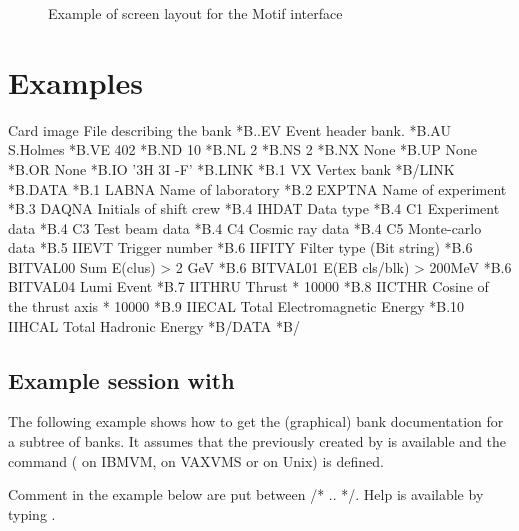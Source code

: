 \begin{figure}[p]
  \begin{center}
     \mbox{}
    \caption{Example of screen layout for the Motif interface}
    \label{fig:DZDOCFIG6}
  \end{center}
\end{figure}

\clearpage
 
\section{Examples}
\label{sec:dzdocexamples} 
 
\begin{XMPt}{Card image File describing the bank }
*B..EV  Event header bank.
*B.AU    S.Holmes
*B.VE    402
*B.ND    10
*B.NL    2
*B.NS    2
*B.NX    None
*B.UP    None
*B.OR    None
*B.IO    '3H 3I -F'
*B.LINK
*B.1   VX       Vertex bank
*B/LINK
*B.DATA
*B.1   LABNA     Name of laboratory
*B.2   EXPTNA    Name of experiment
*B.3   DAQNA     Initials of shift crew 
*B.4   IHDAT     Data type
*B.4   C1        Experiment data
*B.4   C3        Test beam data
*B.4   C4        Cosmic ray data
*B.4   C5        Monte-carlo data
*B.5   IIEVT     Trigger number
*B.6   IIFITY    Filter type (Bit string)
*B.6   BITVAL00  Sum E(clus) > 2 GeV
*B.6   BITVAL01  E(EB cls/blk) > 200MeV
*B.6   BITVAL04  Lumi Event
*B.7   IITHRU    Thrust * 10000
*B.8   IICTHR    Cosine of the thrust axis * 10000
*B.9   IIECAL    Total Electromagnetic Energy
*B.10  IIHCAL    Total Hadronic Energy
*B/DATA
*B/
\end{XMPt}
 
\newpage

\subsection[Example session with {\tt DZEDIT}]{Example session with }
 
The following example shows how to get the (graphical) bank
documentation for a subtree of banks. 
It assumes that the \RZfile{} previously created by  
is available and the command 
 ( on IBMVM, 
 on VAXVMS or  on Unix) is defined. 
 
Comment in the example below are put between /* .. */.
Help is available by typing .
 
